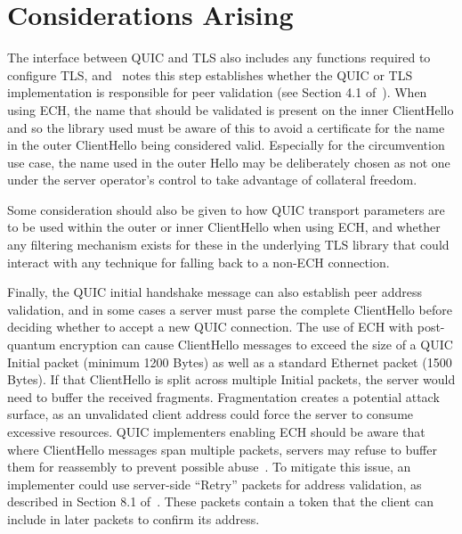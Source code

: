 \section{Considerations Arising}

The interface between QUIC and TLS also includes any functions required to configure TLS, and~\cite{rfc9001} notes this step establishes whether the QUIC or TLS implementation is responsible for peer validation (see Section 4.1 of~\cite{rfc9001}). When using ECH, the name that should be validated is present on the inner ClientHello and so the library used must be aware of this to avoid a certificate for the name in the outer ClientHello being considered valid. Especially for the circumvention use case, the name used in the outer Hello may be deliberately chosen as not one under the server operator's control to take advantage of collateral freedom.

Some consideration should also be given to how QUIC transport parameters are to be used within the outer or inner ClientHello when using ECH, and whether any filtering mechanism exists for these in the underlying TLS library that could interact with any technique for falling back to a non-ECH connection.

Finally, the QUIC initial handshake message can also establish peer address validation, and in some cases a server must parse the complete ClientHello before deciding whether to accept a new QUIC connection.
The use of ECH with post-quantum encryption can cause ClientHello messages to exceed the size of a QUIC Initial packet (minimum 1200 Bytes) as well as a standard Ethernet packet (1500 Bytes).  If that ClientHello is split across multiple Initial packets, the server would need to buffer the received fragments. Fragmentation creates a potential attack surface, as an unvalidated client address could force the server to consume excessive resources. QUIC implementers enabling ECH should be aware that where ClientHello messages span multiple packets, servers may refuse to buffer them for reassembly to prevent possible abuse~\cite{rfc9001}. 
To mitigate this issue, an implementer could use server-side “Retry” packets for address validation, as described in Section 8.1 of~\cite{rfc9000}. These packets contain a token that the client can include in later packets to confirm its address.

